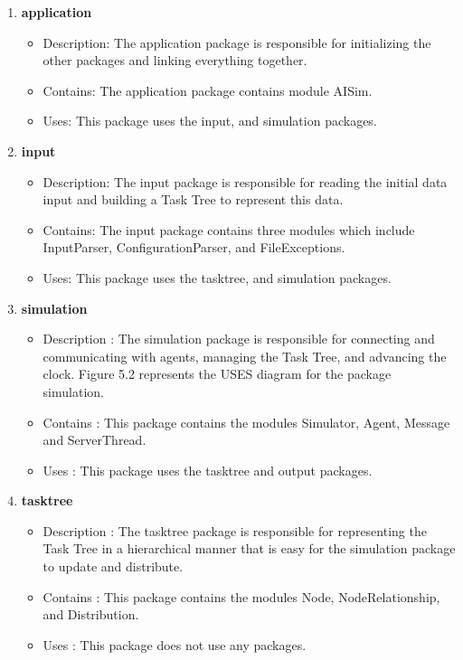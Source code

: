 \begin{enumerate}

\item\textbf{application}
\begin{itemize}
\item Description: The application package is responsible for initializing the other packages and linking everything together.
\item Contains: The application package contains module AISim.
\item Uses: This package uses the input, and simulation packages.
\end{itemize}

\item\textbf{input}
\begin{itemize}
\item Description: The input package is responsible for reading the initial data input and building a Task Tree to represent this data.
\item Contains: The input package contains three modules which include InputParser, ConfigurationParser, and FileExceptions.
\item Uses: This package uses the tasktree, and simulation packages.
\end{itemize}

\item\textbf{simulation}
\begin{itemize}
\item Description : The simulation package is responsible for connecting and communicating with agents, managing the Task Tree, and advancing the clock. Figure 5.2 represents the USES diagram for the package simulation.
\item Contains : This package contains the modules Simulator, Agent, Message and ServerThread.
\item Uses : This package uses the tasktree and output packages.
\end{itemize}

\item\textbf{tasktree}
\begin{itemize}
\item Description : The tasktree package is responsible for representing the Task Tree in a hierarchical manner that is easy for the simulation package to update and distribute.
\item Contains : This package contains the modules Node, NodeRelationship, and Distribution.
\item Uses : This package does not use any packages.
\end{itemize}


\end{enumerate}
